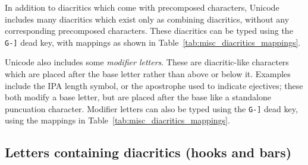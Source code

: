 \documentclass[oneside]{memoir}
\newcommand{\key}{\verb}
\begin{document}
In addition to diacritics which come with precomposed characters, Unicode includes many diacritics which exist only as combining diacritics,
  without any corresponding precomposed characters.
These diacritics can be typed using the \key|G-]| dead key, with mappings as shown in Table~\ref{tab:misc_diacritics_mappings}.

Unicode also includes some \textit{modifier letters}.
These are diacritic-like characters which are placed after the base letter rather than above or below it.
Examples include the \textsc{IPA} length symbol, or the apostrophe used to indicate ejectives;
  these both modify a base letter, but are placed after the base like a standalone puncuation character.
Modifier letters can also be typed using the \key|G-]| dead key, using the mappings in Table~\ref{tab:misc_diacritics_mappings}.

\subsection{Letters containing diacritics (hooks and bars)}
\label{sec:letters_containing_diacritics}
\end{document}
